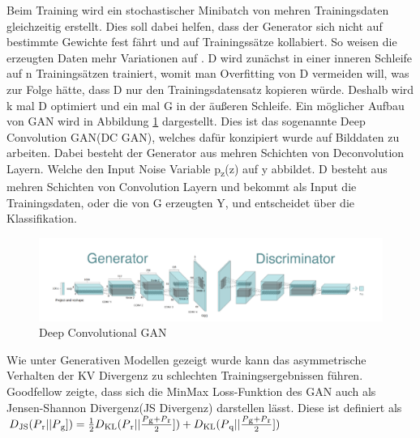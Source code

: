 \documentclass{llncs}
\begin{document}
Beim Training wird ein stochastischer Minibatch von mehren Trainingsdaten gleichzeitig erstellt. Dies soll dabei helfen, dass der Generator sich nicht auf bestimmte Gewichte fest fährt und auf Trainingssätze kollabiert. So weisen die erzeugten Daten mehr Variationen auf \cite{improvingan}. D wird zunächst in einer inneren Schleife auf n Trainingsätzen trainiert, womit man Overfitting von D vermeiden will, was zur Folge hätte, dass D nur den Trainingsdatensatz kopieren würde. Deshalb wird k mal D optimiert und ein mal G in der äußeren Schleife. 
\newpage
Ein möglicher Aufbau von GAN wird in Abbildung \ref{fig:Bild6} dargestellt. Dies ist das sogenannte Deep Convolution GAN(DC GAN), welches dafür konzipiert wurde auf Bilddaten zu arbeiten. Dabei besteht der Generator aus mehren Schichten von Deconvolution Layern. Welche den Input Noise Variable p\textsubscript{z}(z) auf y abbildet. D besteht aus mehren Schichten von Convolution Layern und bekommt als Input die Trainingsdaten, oder die von G erzeugten Y, und entscheidet über die Klassifikation\cite{dcgan}.

\begin{figure}[htbp] 
	\centering
	\includegraphics[width=1.0\textwidth]{dcgan1.png}
	\caption{Deep Convolutional GAN}
	\label{fig:Bild6}
\end{figure}

Wie unter Generativen Modellen gezeigt wurde kann das asymmetrische Verhalten der KV Divergenz zu schlechten Trainingsergebnissen führen. Goodfellow \cite{goodfellow2014} zeigte, dass sich die MinMax Loss-Funktion des GAN auch als Jensen-Shannon Divergenz(JS Divergenz) darstellen lässt. Diese ist definiert als\\

\begin{math} D\textsubscript{JS}(P\textsubscript{r}|| P\textsubscript{g}])=\frac{1}{2}D\textsubscript{KL}(P\textsubscript{r}|| \frac{P\textsubscript{g}+P\textsubscript{r}}{2}])+D\textsubscript{KL}(P\textsubscript{q}|| \frac{P\textsubscript{g}+P\textsubscript{r}}{2}])  
\end{math}
\\
\end{document}
